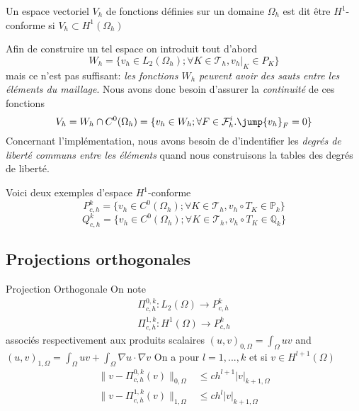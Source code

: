   \begin{definition}
    \label{def:35}
    Un espace vectoriel $V_h$ de fonctions définies sur un domaine $\Omega_h$
    est dit être $H^1$-conforme si $V_h \subset H^1(\Omega_h)$
  \end{definition}
  Afin de construire un tel espace on introduit tout d'abord
    \begin{equation}
      \label{eq:52}
      W_h = \{v_h \in L_2(\Omega_h); \forall K \in \mathcal{T}_h, v_h|_K \in P_K\}
    \end{equation}
    mais ce n'est pas suffisant: \emph{les fonctions $W_h$ peuvent avoir des
    sauts entre les éléments du maillage}. Nous avons donc besoin d'assurer la
    \emph{continuité} de ces fonctions
    \begin{equation}
      \label{eq:53}
      V_h = W_h \cap C^0(\Omega_h) = \{ v_h \in W_h; \forall F \in
      \mathcal{F}^i_h. \jump{v_h}_F = 0\}
    \end{equation}
    Concernant l'implémentation, nous avons besoin de d'indentifier les
    \emph{degrés de liberté communs entre les éléments} quand nous construisons
    la tables des degrés de liberté.

    Voici deux exemples d'espace $H^1$-conforme
    \begin{equation}
      \label{eq:54}
      P^k_{c,h} = \{ v_h \in C^0(\Omega_h); \forall K \in \mathcal{T}_h, v_h
      \circ T_K \in \mathbb{P}_k\}
    \end{equation}
    \begin{equation}
      \label{eq:55}
      Q^k_{c,h} = \{ v_h \in C^0(\Omega_h); \forall K \in \mathcal{T}_h, v_h
      \circ T_K \in \mathbb{Q}_k\}
    \end{equation}

    \subsection{Projections orthogonales}
    \label{sec:proj-orth}

    \begin{definition}{Projection Orthogonale}
      \label{def:36}
      On note
      \begin{eqnarray}
        \label{eq:56}
        \Pi^{0,k}_{c,h} : L_2(\Omega) \rightarrow P^k_{c,h}\\
        \Pi^{1,k}_{c,h} : H^1(\Omega) \rightarrow P^k_{c,h}
      \end{eqnarray}
      associés respectivement aux produits scalaires
      $(u,v)_{0,\Omega} = \int_\Omega u v$ and $(u,v)_{1,\Omega} = \int_\Omega u
      v + \int_\Omega \nabla u \cdot \nabla v$
      On a pour $l=1,...,k$ et si $v \in H^{l+1}(\Omega)$
      \begin{eqnarray}
        \label{eq:57}
        \|v - \Pi^{0,k}_{c,h}(v)\|_{0,\Omega} &\leq c h^{l+1} |v|_{k+1,\Omega} \\
        \|v - \Pi^{1,k}_{c,h}(v)\|_{1,\Omega} &\leq c h^{l} |v|_{k+1,\Omega}
      \end{eqnarray}
    \end{definition}

